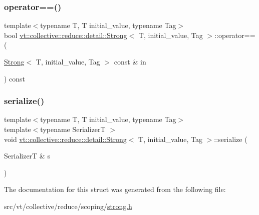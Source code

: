 \subsubsection{\texorpdfstring{operator==()}{operator==()}}
{\footnotesize\ttfamily template$<$typename T, T initial\+\_\+value, typename Tag$>$ \\
bool \hyperlink{structvt_1_1collective_1_1reduce_1_1detail_1_1_strong}{vt\+::collective\+::reduce\+::detail\+::\+Strong}$<$ T, initial\+\_\+value, Tag $>$\+::operator== (\begin{DoxyParamCaption}\item[{\hyperlink{structvt_1_1collective_1_1reduce_1_1detail_1_1_strong}{Strong}$<$ T, initial\+\_\+value, Tag $>$ const \&}]{in }\end{DoxyParamCaption}) const\hspace{0.3cm}{\ttfamily [inline]}}

\mbox{\label{structvt_1_1collective_1_1reduce_1_1detail_1_1_strong_a6abf31948f9dbd77f4caeb265fd68586}} 
\subsubsection{\texorpdfstring{serialize()}{serialize()}}
{\footnotesize\ttfamily template$<$typename T, T initial\+\_\+value, typename Tag$>$ \\
template$<$typename SerializerT $>$ \\
void \hyperlink{structvt_1_1collective_1_1reduce_1_1detail_1_1_strong}{vt\+::collective\+::reduce\+::detail\+::\+Strong}$<$ T, initial\+\_\+value, Tag $>$\+::serialize (\begin{DoxyParamCaption}\item[{SerializerT \&}]{s }\end{DoxyParamCaption})\hspace{0.3cm}{\ttfamily [inline]}}



The documentation for this struct was generated from the following file\+:\begin{DoxyCompactItemize}
\item 
src/vt/collective/reduce/scoping/\hyperlink{strong_8h}{strong.\+h}\end{DoxyCompactItemize}
